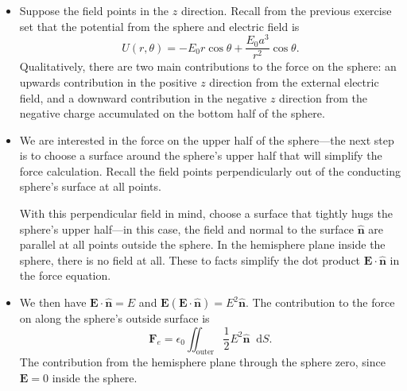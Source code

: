 \documentclass[11pt, a4paper]{article}
\newcommand{\diff}{\mathop{}\!\mathrm{d}} %
\renewcommand{\vec}[1]{\bm{#1}} %
\newcommand{\uvec}[1]{\hat{\vec{#1}}} %
\newcommand{\E}{\vec{E}}  %
\newcommand{\ee}{\epsilon_{0}}  %
\begin{document}
\begin{itemize}
	\item Suppose the field points in the $ z $ direction. Recall from the previous exercise set that the potential from the sphere and electric field is
	\begin{equation*}
		U(r, \theta) = - E_{0}r \cos \theta + \frac{E_{0}a^{3}}{r^{2}}\cos \theta.
	\end{equation*}
	Qualitatively, there are two main contributions to the force on the sphere: an upwards contribution in the positive $ z $ direction from the external electric field, and a downward contribution in the negative $ z $ direction from the negative charge accumulated on the bottom half of the sphere. 
	
	\item We are interested in the force on the upper half of the sphere---the next step is to choose a surface around the sphere's upper half that will simplify the force calculation. Recall the field points perpendicularly out of the conducting sphere's surface at all points. 
	
	With this perpendicular field in mind, choose a surface that tightly hugs the sphere's upper half---in this case, the field and normal to the surface $ \uvec{n} $ are parallel at all points outside the sphere. In the hemisphere plane inside the sphere, there is no field at all. These to facts simplify the dot product $ \E \cdot \uvec{n} $ in the force equation. 
	
	\item We then have $ \E \cdot \uvec{n} = E $ and $ \E( \E \cdot \uvec{n}) = E^{2}\uvec{n} $. The contribution to the force on along the sphere's outside surface is
	\begin{equation*}
		\vec{F}_{e} = \ee \iint_{\text{outer}} \frac{1}{2} E^{2} \uvec{n} \diff S.
	\end{equation*}
	The contribution from the hemisphere plane through the sphere zero, since $ \E = 0 $ inside the sphere. 
	

\end{itemize}
\end{document}
